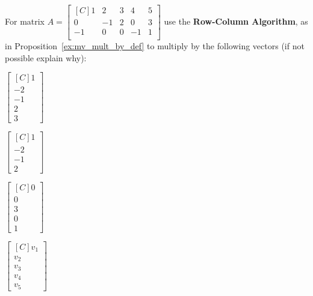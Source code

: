 \begin{exercise}For matrix 
$A=\begin{bmatrix*}[C]
1  & 2  & 3 & 4 & 5 \\
0  & -1 & 2 & 0 & 3 \\
-1 & 0  & 0 & -1& 1 \\
\end{bmatrix*}$
use the \textbf{Row-Column Algorithm}, as in 
Proposition~\ref{ex:mv_mult_by_def}
to  multiply by the following vectors (if not possible explain why):\\
\begin{inparaenum}[a.)]
\item $\begin{bmatrix*}[C]1 \\ -2 \\ -1 \\ 2 \\ 3\end{bmatrix*}$\quad 
\item $\begin{bmatrix*}[C]1 \\ -2 \\ -1 \\ 2\end{bmatrix*}$\quad 
\item $\begin{bmatrix*}[C]0 \\ 0 \\ 3 \\ 0 \\ 1\end{bmatrix*}$\quad
\item $\begin{bmatrix*}[C]v_1 \\ v_2 \\ v_3 \\ v_4 \\ v_5\end{bmatrix*}$
\end{inparaenum}
\end{exercise}

